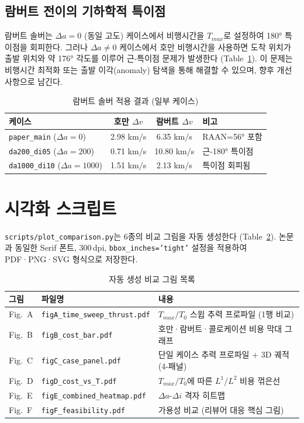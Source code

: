 \documentclass[11pt]{article}
\begin{document}
\subsection{람버트 전이의 기하학적 특이점}

람버트 솔버는 $\Delta a = 0$ (동일 고도) 케이스에서 비행시간을 $T_{max}$로 설정하여 180° 특이점을 회피한다.
그러나 $\Delta a \neq 0$ 케이스에서 호만 비행시간을 사용하면 도착 위치가 출발 위치와 약 176° 각도를 이루어 근-특이점 문제가 발생한다 (Table~\ref{tab:lambert_issue}).
이 문제는 비행시간 최적화 또는 출발 이각(anomaly) 탐색을 통해 해결할 수 있으며, 향후 개선 사항으로 남긴다.

\begin{table}[!h]
\centering
\caption{람버트 솔버 적용 결과 (일부 케이스)}
\label{tab:lambert_issue}
\begin{tabular}{lccl}
\toprule
케이스 & 호만 $\Delta v$ & 람버트 $\Delta v$ & 비고 \\
\midrule
\texttt{paper\_main} ($\Delta a=0$)    & 2.98 km/s &  6.35 km/s & RAAN=56° 포함 \\
\texttt{da200\_di05} ($\Delta a=200$)  & 0.71 km/s & 10.80 km/s & 근-180° 특이점 \\
\texttt{da1000\_di10} ($\Delta a=1000$)& 1.51 km/s &  2.13 km/s & 특이점 회피됨 \\
\bottomrule
\end{tabular}
\end{table}


\section{시각화 스크립트}

\texttt{scripts/plot\_comparison.py}는 6종의 비교 그림을 자동 생성한다 (Table~\ref{tab:figures}).
논문과 동일한 Serif 폰트, 300\,dpi, \texttt{bbox\_inches='tight'} 설정을 적용하여 PDF·PNG·SVG 형식으로 저장한다.

\begin{table}[!h]
\centering
\caption{자동 생성 비교 그림 목록}
\label{tab:figures}
\begin{tabular}{llp{7cm}}
\toprule
그림 & 파일명 & 내용 \\
\midrule
Fig.~A & \texttt{figA\_time\_sweep\_thrust.pdf} & $T_{max}/T_0$ 스윕 추력 프로파일 (1행 비교) \\
Fig.~B & \texttt{figB\_cost\_bar.pdf}           & 호만·람버트·콜로케이션 비용 막대 그래프 \\
Fig.~C & \texttt{figC\_case\_panel.pdf}         & 단일 케이스 추력 프로파일 + 3D 궤적 (4-패널) \\
Fig.~D & \texttt{figD\_cost\_vs\_T.pdf}         & $T_{max}/T_0$에 따른 $L^1$/$L^2$ 비용 꺾은선 \\
Fig.~E & \texttt{figE\_combined\_heatmap.pdf}   & $\Delta a$-$\Delta i$ 격자 히트맵 \\
Fig.~F & \texttt{figF\_feasibility.pdf}         & 가용성 비교 (리뷰어 대응 핵심 그림) \\
\bottomrule
\end{tabular}
\end{table}
\end{document}
